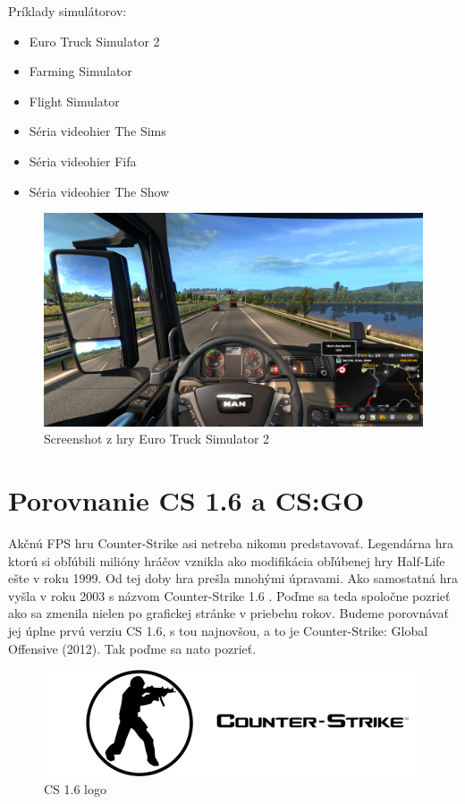 \documentclass[10pt,twoside,slovak,a4paper]{article}
\begin{document}
Príklady simulátorov:
\begin{itemize}
\item Euro Truck Simulator 2
\item Farming Simulator
\item Flight Simulator
\item Séria videohier The Sims
\item Séria videohier Fifa
\item Séria videohier The Show
\end{itemize}

\begin{figure}[tbh]
\centering
\includegraphics[scale=0.15]{ets.jpg}
\caption{Screenshot z hry Euro Truck Simulator 2}
\label{f:ets2}
\end{figure}

\section{Porovnanie CS 1.6 a CS:GO} \label{porovnanie}

Akčnú FPS hru Counter-Strike asi netreba nikomu predstavovať. Legendárna hra ktorú si obľúbili milióny hráčov vznikla ako modifikácia obľúbenej hry Half-Life ešte v roku 1999. Od tej doby hra prešla mnohými úpravami. Ako samostatná hra vyšla v roku 2003 s názvom Counter-Strike 1.6 . Poďme sa teda spoločne pozrieť ako sa zmenila nielen po grafickej stránke v priebehu rokov. Budeme porovnávať jej úplne prvú verziu CS 1.6, s tou najnovšou, a to je Counter-Strike: Global Offensive (2012). Tak poďme sa nato pozrieť.

\begin{figure}[tbh]
\centering
\includegraphics[scale=0.8]{cs16.png}
\caption{CS 1.6 logo}
\label{f:cs1.6}
\end{figure}
\end{document}

